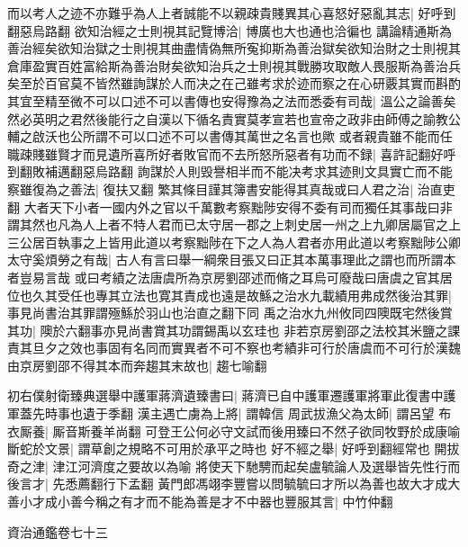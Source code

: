 而以考人之迹不亦難乎為人上者誠能不以親疎貴賤異其心喜怒好惡亂其志|{
	好呼到翻惡烏路翻}
欲知治經之士則視其記覽博洽|{
	博廣也大也通也洽徧也}
講論精通斯為善治經矣欲知治獄之士則視其曲盡情偽無所寃抑斯為善治獄矣欲知治財之士則視其倉庫盈實百姓富給斯為善治財矣欲知治兵之士則視其戰勝攻取敵人畏服斯為善治兵矣至於百官莫不皆然雖詢謀於人而决之在己雖考求於迹而察之在心研覈其實而斟酌其宜至精至微不可以口述不可以書傳也安得豫為之法而悉委有司哉|{
	溫公之論善矣然必英明之君然後能行之自漢以下循名責實莫孝宣若也宣帝之政非由師傅之諭教公輔之啟沃也公所謂不可以口述不可以書傳其萬世之名言也歟}
或者親貴雖不能而任職疎賤雖賢才而見遺所喜所好者敗官而不去所怒所惡者有功而不録|{
	喜許記翻好呼到翻敗補邁翻惡烏路翻}
詢謀於人則毁譽相半而不能决考求其迹則文具實亡而不能察雖復為之善法|{
	復扶又翻}
繁其條目謹其簿書安能得其真哉或曰人君之治|{
	治直吏翻}
大者天下小者一國内外之官以千萬數考察黜陟安得不委有司而獨任其事哉曰非謂其然也凡為人上者不特人君而已太守居一郡之上刺史居一州之上九卿居屬官之上三公居百執事之上皆用此道以考察黜陟在下之人為人君者亦用此道以考察黜陟公卿太守奚煩勞之有哉|{
	古人有言曰舉一綱衆目張又曰正其本萬事理此之謂也而所謂本者豈易言哉}
或曰考績之法唐虞所為京房劉邵述而脩之耳烏可廢哉曰唐虞之官其居位也久其受任也專其立法也寛其責成也遠是故鯀之治水九載績用弗成然後治其罪|{
	事見尚書治其罪謂殛鯀於羽山也治直之翻下同}
禹之治水九州攸同四隩既宅然後賞其功|{
	隩於六翻事亦見尚書賞其功謂錫禹以玄珪也}
非若京房劉邵之法校其米鹽之課責其旦夕之效也事固有名同而實異者不可不察也考績非可行於唐虞而不可行於漢魏由京房劉邵不得其本而奔趨其末故也|{
	趨七喻翻}


初右僕射衛臻典選舉中護軍蔣濟遺臻書曰|{
	蔣濟已自中護軍遷護軍將軍此復書中護軍蓋先時事也遺于季翻}
漢主遇亡虜為上將|{
	謂韓信}
周武拔漁父為太師|{
	謂呂望}
布衣厮養|{
	厮音斯養羊尚翻}
可登王公何必守文試而後用臻曰不然子欲同牧野於成康喻斷蛇於文景|{
	謂草創之規略不可用於承平之時也}
好不經之舉|{
	好呼到翻經常也}
開拔奇之津|{
	津江河濟度之要故以為喻}
將使天下馳騁而起矣盧毓論人及選舉皆先性行而後言才|{
	先悉薦翻行下孟翻}
黃門郎馮翊李豐嘗以問毓毓曰才所以為善也故大才成大善小才成小善今稱之有才而不能為善是才不中器也豐服其言|{
	中竹仲翻}


資治通鑑卷七十三
